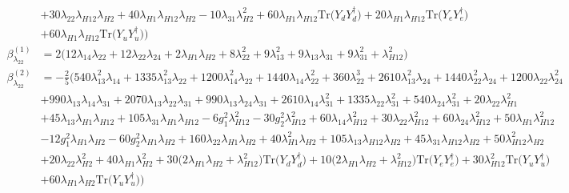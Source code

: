 {\begin{align}
 &+30 \lambda_{22} \lambda_{H12} \lambda_{H2} +40 \lambda_{H1} \lambda_{H12} \lambda_{H2} -10 \lambda_{31} \lambda_{H2}^{2} +60 \lambda_{H1} \lambda_{H12} \mbox{Tr}\Big({Y_d  Y_{d}^{\dagger}}\Big) +20 \lambda_{H1} \lambda_{H12} \mbox{Tr}\Big({Y_e  Y_{e}^{\dagger}}\Big) \nonumber \\ 
 &+60 \lambda_{H1} \lambda_{H12} \mbox{Tr}\Big({Y_u  Y_{u}^{\dagger}}\Big) \Big)\\ 
\beta_{\lambda_{22}}^{(1)} & =  
2 \Big(12 \lambda_{14} \lambda_{22}  + 12 \lambda_{22} \lambda_{24}  + 2 \lambda_{H1} \lambda_{H2}  + 8 \lambda_{22}^{2}  + 9 \lambda_{13}^{2}  + 9 \lambda_{13} \lambda_{31}  + 9 \lambda_{31}^{2}  + \lambda_{H12}^{2}\Big)\\ 
\beta_{\lambda_{22}}^{(2)} & =  
-\frac{2}{5} \Big(540 \lambda_{13}^{2} \lambda_{14} +1335 \lambda_{13}^{2} \lambda_{22} +1200 \lambda_{14}^{2} \lambda_{22} +1440 \lambda_{14} \lambda_{22}^{2} +360 \lambda_{22}^{3} +2610 \lambda_{13}^{2} \lambda_{24} +1440 \lambda_{22}^{2} \lambda_{24} +1200 \lambda_{22} \lambda_{24}^{2} \nonumber \\ 
 &+990 \lambda_{13} \lambda_{14} \lambda_{31} +2070 \lambda_{13} \lambda_{22} \lambda_{31} +990 \lambda_{13} \lambda_{24} \lambda_{31} +2610 \lambda_{14} \lambda_{31}^{2} +1335 \lambda_{22} \lambda_{31}^{2} +540 \lambda_{24} \lambda_{31}^{2} +20 \lambda_{22} \lambda_{H1}^{2} \nonumber \\ 
 &+45 \lambda_{13} \lambda_{H1} \lambda_{H12} +105 \lambda_{31} \lambda_{H1} \lambda_{H12} -6 g_{1}^{2} \lambda_{H12}^{2} -30 g_{2}^{2} \lambda_{H12}^{2} +60 \lambda_{14} \lambda_{H12}^{2} +30 \lambda_{22} \lambda_{H12}^{2} +60 \lambda_{24} \lambda_{H12}^{2} +50 \lambda_{H1} \lambda_{H12}^{2} \nonumber \\ 
 &-12 g_{1}^{2} \lambda_{H1} \lambda_{H2} -60 g_{2}^{2} \lambda_{H1} \lambda_{H2} +160 \lambda_{22} \lambda_{H1} \lambda_{H2} +40 \lambda_{H1}^{2} \lambda_{H2} +105 \lambda_{13} \lambda_{H12} \lambda_{H2} +45 \lambda_{31} \lambda_{H12} \lambda_{H2} +50 \lambda_{H12}^{2} \lambda_{H2} \nonumber \\ 
 &+20 \lambda_{22} \lambda_{H2}^{2} +40 \lambda_{H1} \lambda_{H2}^{2} +30 \Big(2 \lambda_{H1} \lambda_{H2}  + \lambda_{H12}^{2}\Big)\mbox{Tr}\Big({Y_d  Y_{d}^{\dagger}}\Big) +10 \Big(2 \lambda_{H1} \lambda_{H2}  + \lambda_{H12}^{2}\Big)\mbox{Tr}\Big({Y_e  Y_{e}^{\dagger}}\Big) +30 \lambda_{H12}^{2} \mbox{Tr}\Big({Y_u  Y_{u}^{\dagger}}\Big) \nonumber \\ 
 &+60 \lambda_{H1} \lambda_{H2} \mbox{Tr}\Big({Y_u  Y_{u}^{\dagger}}\Big) \Big)\\ 

\end{align}}

